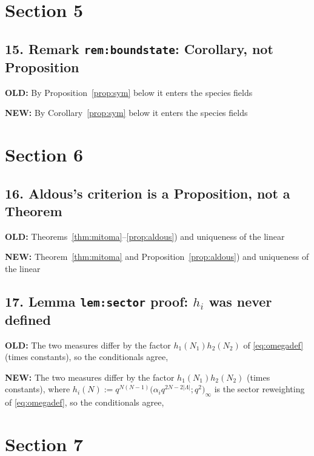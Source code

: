 \documentclass[11pt]{article}
\newenvironment{old}{\par\noindent\textcolor{oldred}{\textbf{OLD:}}\small\color{oldred}\verbatim}{\endverbatim\normalsize\color{black}}
\newenvironment{new}{\par\noindent\textcolor{newgreen}{\textbf{NEW:}}\small\color{newgreen}\verbatim}{\endverbatim\normalsize\color{black}}
\begin{document}
\section*{Section 5}

\subsection*{15. Remark \texttt{rem:boundstate}: Corollary, not Proposition}
\begin{old}
By Proposition~\ref{prop:sym} below it enters the species fields
\end{old}
\begin{new}
By Corollary~\ref{prop:sym} below it enters the species fields
\end{new}

\section*{Section 6}

\subsection*{16. Aldous's criterion is a Proposition, not a Theorem}
\begin{old}
Theorems~\ref{thm:mitoma}--\ref{prop:aldous}) and uniqueness of the linear
\end{old}
\begin{new}
Theorem~\ref{thm:mitoma} and Proposition~\ref{prop:aldous}) and uniqueness of
the linear
\end{new}

\subsection*{17. Lemma \texttt{lem:sector} proof: $h_i$ was never defined}
\begin{old}
The two measures differ by the factor $h_1(N_1)h_2(N_2)$ of \eqref{eq:omegadef}
(times constants), so the conditionals agree,
\end{old}
\begin{new}
The two measures differ by the factor $h_1(N_1)h_2(N_2)$ (times constants), where
$h_i(N):=q^{N(N-1)}\big(\alpha_i q^{2N-2|\Lambda|};q^2\big)_\infty$ is the sector
reweighting of \eqref{eq:omegadef}, so the conditionals agree,
\end{new}

\section*{Section 7}
\end{document}
